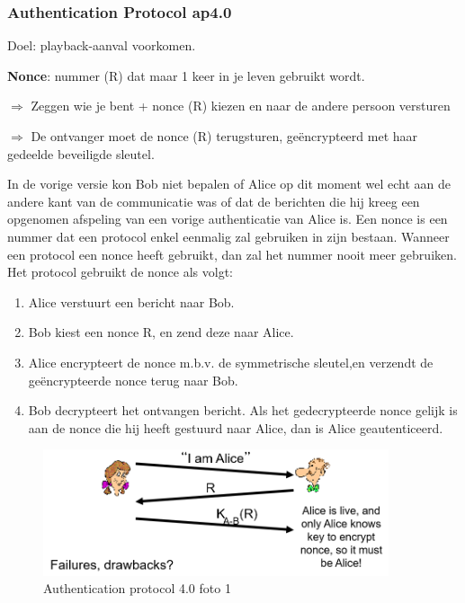 \subsubsection{Authentication Protocol ap4.0}

Doel: playback-aanval voorkomen.

\noindent \textbf{Nonce}: nummer (R) dat maar 1 keer in je leven gebruikt wordt.


$\Rightarrow$ Zeggen wie je bent + nonce (R) kiezen en naar de andere persoon versturen

$\Rightarrow$ De ontvanger moet de nonce (R) terugsturen, geëncrypteerd met haar gedeelde beveiligde sleutel.

\noindent In de vorige versie kon Bob niet bepalen of Alice op dit moment wel echt aan de andere kant van de communicatie was of dat de berichten die hij kreeg een opgenomen afspeling van een vorige authenticatie van Alice is. Een nonce is een nummer dat een protocol enkel eenmalig zal gebruiken in zijn bestaan. Wanneer een protocol een nonce heeft gebruikt, dan zal het nummer nooit meer gebruiken. Het protocol gebruikt de nonce als volgt:
\begin{enumerate}
    \item Alice verstuurt een bericht naar Bob.
\item Bob kiest een nonce R, en zend deze naar Alice.
\item Alice encrypteert de nonce m.b.v. de symmetrische sleutel,en verzendt de geëncrypteerde nonce terug naar Bob.
\item Bob decrypteert het ontvangen bericht. Als het gedecrypteerde nonce gelijk is aan de nonce die hij heeft gestuurd naar Alice, dan is Alice geautenticeerd.

\end{enumerate}

\begin{figure}[h]
    \centering
    \includegraphics[width=4in]{./img/imghfdst8/hfdst8puntje20.png}
    \caption{Authentication protocol 4.0 foto 1 }      
    \label{fig:Authentication protocol 4.0 foto 1 }
\end{figure}

